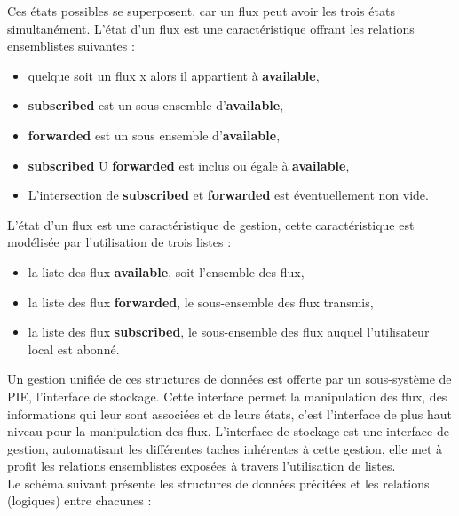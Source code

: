 Ces états possibles se superposent, car un flux peut avoir les trois états simultanément.
L'état d'un flux est une caractéristique offrant les relations ensemblistes suivantes : \\

\begin{itemize}
	\item quelque soit un flux x alors il appartient à \textbf{available},
	\item \textbf{subscribed} est un sous ensemble d'\textbf{available},
	\item \textbf{forwarded} est un sous ensemble d'\textbf{available},
	\item \textbf{subscribed} U \textbf{forwarded} est inclus ou égale à \textbf{available},
	\item L'intersection de \textbf{subscribed} et \textbf{forwarded} est éventuellement non vide.\\
\end{itemize}

L'état d'un flux est une caractéristique de gestion, cette caractéristique est modélisée
par l'utilisation de trois listes : \\

\begin{itemize}
	\item la liste des flux \textbf{available}, soit l'ensemble des flux,
	\item la liste des flux \textbf{forwarded}, le sous-ensemble des flux transmis,
	\item la liste des flux \textbf{subscribed}, le sous-ensemble des flux auquel l'utilisateur local est abonné. \\
\end{itemize}

Un gestion unifiée de ces structures de données est offerte par un sous-système de PIE,
l'interface de stockage. Cette interface permet la manipulation des flux, des informations 
qui leur sont associées et de leurs états, c'est l'interface de plus haut niveau pour la
manipulation des flux. L'interface de stockage est une interface de gestion, automatisant
les différentes taches inhérentes à cette gestion, elle met à profit les relations ensemblistes 
exposées à travers l'utilisation de listes. \\

Le schéma suivant présente les structures de données précitées et les relations (logiques)
entre chacunes :  \\

